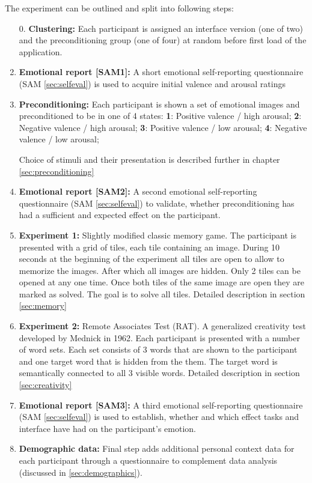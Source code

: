 	The experiment can be outlined and split into following steps:
	
	\begin{enumerate}
		
		\item[0.] \textbf{Clustering:} Each participant is assigned an interface version (one of two) and the preconditioning group (one of four) at random before first load of the application.
		
		\item \textbf{Emotional report [SAM1]:} A short emotional self-reporting questionnaire (SAM \ref{sec:selfeval}) is used to acquire initial valence and arousal ratings
		
		\item \textbf{Preconditioning:} Each participant is shown a set of emotional images and preconditioned to be in one of 4 states:
			\textbf{1}: Positive valence / high arousal;
			\textbf{2}: Negative valence / high arousal;
			\textbf{3}: Positive valence / low arousal;
			\textbf{4}: Negative valence / low arousal;
			
		Choice of stimuli and their presentation is described further in chapter \ref{sec:preconditioning}
			
		\item \textbf{Emotional report [SAM2]:} A second emotional self-reporting questionnaire (SAM \ref{sec:selfeval}) to validate, whether preconditioning has had a sufficient and expected effect on the participant.
		
		\item \textbf{Experiment 1:} Slightly modified classic memory game. The participant is presented with a grid of tiles, each tile containing an image. During 10 seconds at the beginning of the experiment all tiles are open to allow to memorize the images. After which all images are hidden. Only 2 tiles can be opened at any one time. Once both tiles of the same image are open they are marked as solved. The goal is to solve all tiles. Detailed description in section \ref{sec:memory}
		
		\item \textbf{Experiment 2:} Remote Associates Test (RAT). A generalized creativity test developed by Mednick \cite{Mednick1962} in 1962. Each participant is presented with a number of word sets. Each set consists of 3 words that are shown to the participant and one target word that is hidden from the them. The target word is semantically connected to all 3 visible words. Detailed description in section \ref{sec:creativity}
		
		\item \textbf{Emotional report [SAM3]:} A third emotional self-reporting questionnaire (SAM \ref{sec:selfeval}) is used to establish, whether and which effect tasks and interface have had on the participant's emotion.
		
		\item \textbf{Demographic data:} Final step adds additional personal context data for each participant through a questionnaire to complement data analysis (discussed in \ref{sec:demographics}).
		
	\end{enumerate}
	
